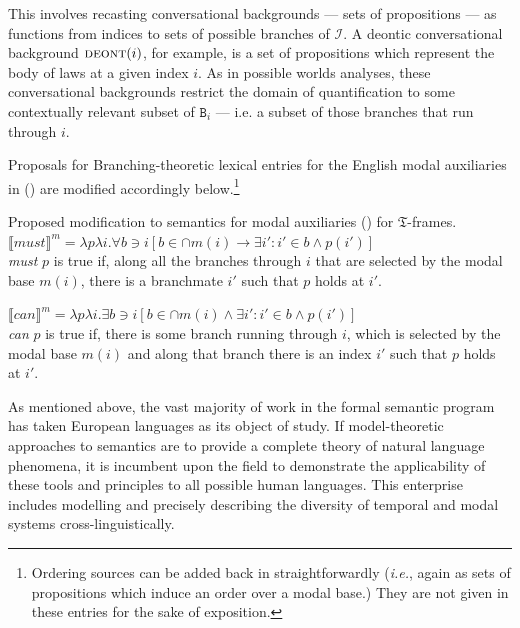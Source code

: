 \documentclass[12pt,dvipsnames]{report}
\providecommand{\denote}[2][]{\ensuremath{\llbracket{#2}\rrbracket^{#1}}}
\begin{document}
This involves recasting conversational backgrounds --- sets of propositions --- as functions from indices to sets of possible branches of $ \mathcal I $. A deontic conversational background $ \textsc{deont}(i) $, for example, is a set of propositions which represent the body of laws at a given index $ i $. As in possible worlds analyses, these conversational backgrounds restrict the domain of quantification to some contextually relevant subset of  $ \texttt{B}_i $ --- i.e. a subset of those branches that run through $ i $.

Proposals for Branching-theoretic lexical entries for the English modal auxiliaries in () are modified accordingly below.\footnote{Ordering sources can be added back in straightforwardly (\textit{i.e.}, again as sets of propositions which induce an order over a modal base.) They are not given in these entries for the sake of exposition.}

\pex[exno=\getref{K-modals}′⁣] Proposed modification to semantics for modal auxiliaries () for $ \mathfrak T $-frames.
\a$ \denote[m]{\textit{must}}=\lambda p\lambda i.\forall b\ni i[b\in\cap m(i)\to \exists i':i'\in b\wedge p(i')] $\\
\textit{must} $ p $ is true if, along all the branches through $ i $ that are selected by the modal base $ m(i) $, there is a branchmate $ i' $ such that $ p $ holds at $ i' $.

\a$ \denote[m]{\textit{can}}=\lambda p\lambda i.\exists b\ni i[b\in\cap m(i)\wedge \exists i':i'\in b\wedge p(i')] $\\
\textit{ can } $ p $ is true if, there is some branch running through $ i $, which is selected by the modal base $ m(i) $ and along that branch there is an index $ i' $ such that $ p $ holds at $ i' $.


\xe



As mentioned above, the vast majority of work in the formal semantic program has taken European languages as its object of study. If model-theoretic approaches to semantics are to provide a complete theory of natural language phenomena, it is incumbent upon the field to demonstrate the applicability of these tools and principles to all possible human languages. This enterprise includes modelling and precisely describing the diversity of temporal and modal systems cross-linguistically.
\end{document}

